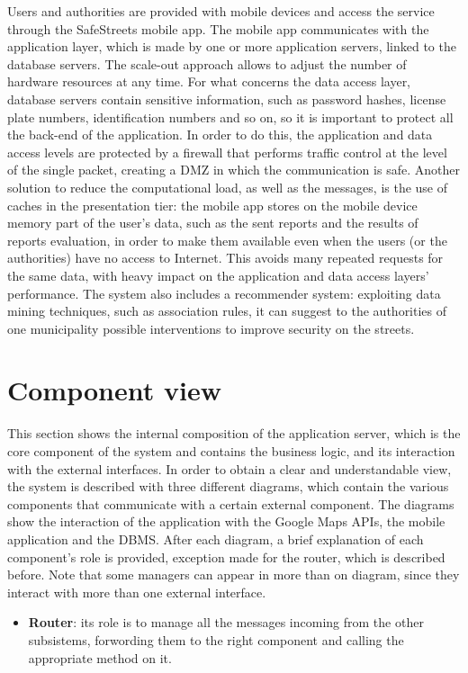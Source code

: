 \documentclass[12pt,a4paper]{report}
\begin{document}
	Users and authorities are provided with mobile devices and access the service through
	the SafeStreets mobile app. The mobile app communicates with the application layer, which
	is made by one or more application servers, linked to the database servers. The scale-out approach allows to adjust the number of hardware resources at any time. For what concerns the data access layer, database servers contain sensitive information, such as password hashes, license plate numbers, identification numbers and so on, so it is important to protect all the back-end of the application. In order to do this, the application and data access levels are protected by a firewall that performs traffic control at the level of the single packet, creating a DMZ in which the communication is safe. Another solution to reduce the computational load, as well as the messages, is the use of caches in the presentation tier: the mobile app stores on the mobile device memory part of the user's data, such as the sent reports and the results of reports evaluation, in order to make them available even when the users (or the authorities) have no access to Internet. This avoids many repeated requests for the same data, with heavy impact on the application and data access layers' performance.
The system also includes a recommender system: exploiting data mining techniques, such as association rules, it can suggest to the authorities of one municipality possible interventions to improve security on the streets.

		\section{Component view}
		This section shows the internal composition of the application server, which is the core component of the system and contains the business logic,
		and its interaction with the external interfaces. In order to obtain a clear and understandable view, the system is described with three different diagrams,
		which contain the various components that communicate with a certain external component. The diagrams show the interaction of the application with the
		Google Maps APIs, the mobile application and the DBMS. After each diagram, a brief explanation of each component's role is provided, exception made for the 
		router, which is described before. Note that some managers can appear in more than on diagram, since they interact with more than one external
		interface.	
		
		\begin{itemize}
			\item\textbf{Router}: its role is to manage all the messages incoming from the other subsistems, forwording them to the right component and calling
			the appropriate method on it.
		\end{itemize}
\end{document}
